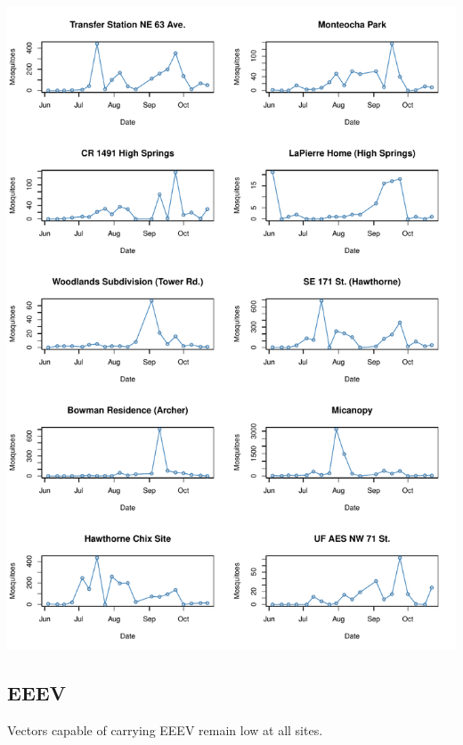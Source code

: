 \documentclass{article}
\begin{document}
\begin{center}
\includegraphics{mosq28oct13-009}

\newpage
\subsection*{EEEV}

\end{center}

Vectors capable of carrying EEEV remain low at all sites.\\
\end{document}
